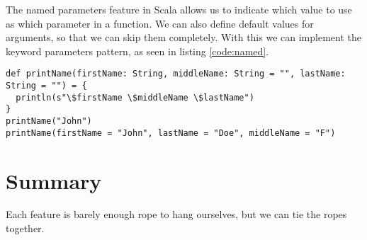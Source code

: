 The named parameters feature in Scala allows us to indicate which value to use as which parameter in a function. We can also define default values for arguments, so that we can skip them completely. With this we can implement the keyword parameters pattern, as seen in listing \ref{code:named}.

\begin{lstlisting}[caption=Named parameters \& default arguments, label=code:named]
def printName(firstName: String, middleName: String = "", lastName: String = "") = {
  println(s"\$firstName \$middleName \$lastName")
}
printName("John")
printName(firstName = "John", lastName = "Doe", middleName = "F")
\end{lstlisting}


\section{Summary}
Each feature is barely enough rope to hang ourselves, but we can tie the ropes together.
